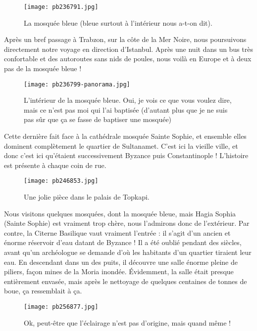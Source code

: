 \documentclass{book}
\begin{document}
\begin{figure}[h]
\centering
\texttt{[image: pb236791.jpg]}
\caption*{La mosquée bleue (bleue surtout à l'intérieur nous a-t-on dit).}
\end{figure}

Après un bref passage à Trabzon, sur la côte de la Mer Noire, nous poursuivons directement notre voyage en direction d'Istanbul. Après une nuit dans un bus très confortable et des autoroutes sans nids de poules, nous voilà en Europe et à deux pas de la mosquée bleue !


\begin{figure}[h]
\centering
\texttt{[image: pb236799-panorama.jpg]}
\caption*{L'intérieur de la mosquée bleue. Oui, je vois ce que vous voulez dire, mais ce n'est pas moi qui l'ai baptisée (d'autant plus que je ne suis pas sûr que ça se fasse de baptiser une mosquée)}
\end{figure}

Cette dernière fait face à la cathédrale mosquée Sainte Sophie, et ensemble elles dominent complètement le quartier de Sultanamet. C'est ici la vieille ville, et donc c'est ici qu'étaient successivement Byzance puis Constantinople ! L'histoire est présente à chaque coin de rue.


\begin{figure}[h]
\centering
\texttt{[image: pb246853.jpg]}
\caption*{Une jolie pièce dans le palais de Topkapi.}
\end{figure}

Nous visitons quelques mosquées, dont la mosquée bleue, mais Hagia Sophia (Sainte Sophie) est vraiment trop chère, nous l'admirons donc de l'extérieur. Par contre, la Citerne Basilique vaut vraiment l'entrée : il s'agit d'un ancien et énorme réservoir d'eau datant de Byzance ! Il a été oublié pendant des siècles, avant qu'un archéologue se demande d'où les habitants d'un quartier tiraient leur eau. En descendant dans un des puits, il découvre une salle énorme pleine de piliers, façon mines de la Moria inondée. Évidemment, la salle était presque entièrement envasée, mais après le nettoyage de quelques centaines de tonnes de boue, ça ressemblait à ça.


\begin{figure}[h]
\centering
\texttt{[image: pb256877.jpg]}
\caption*{Ok, peut-être que l'éclairage n'est pas d'origine, mais quand même !}
\end{figure}
\end{document}
